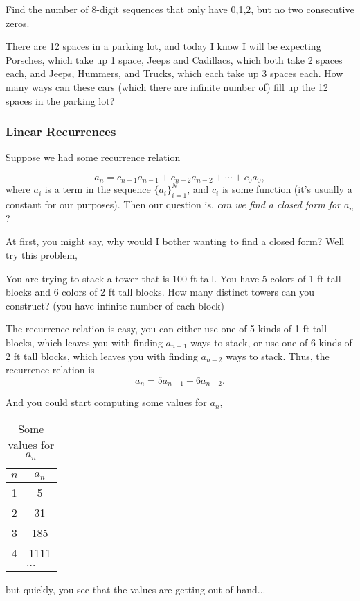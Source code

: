 \begin{ex}
Find the number of 8-digit sequences that only have 0,1,2, but no two consecutive zeros.
\end{ex}

\begin{ex}
There are 12 spaces in a parking lot, and today I know I will be expecting Porsches, which take up 1 space, Jeeps and Cadillacs, which both take 2 spaces each, and Jeeps, Hummers, and Trucks, which each take up 3 spaces each. How many ways can these cars (which there are infinite number of) fill up the 12 spaces in the parking lot?
\end{ex}

\subsubsection{Linear Recurrences}
Suppose we had some recurrence relation 

\begin{equation}
    a_n = c_{n-1}a_{n-1}+c_{n-2}a_{n-2}+\cdots+c_0a_0,
\end{equation}
where $a_i$ is a term in the sequence $\{a_i\}_{i=1}^{N}$, and $c_i$ is some function (it's usually a constant for our purposes). Then our question is, \textit{can we find a closed form for $a_n$}?

At first, you might say, why would I bother wanting to find a closed form? Well try this problem,

\begin{ex}
You are trying to stack a tower that is 100 ft tall. You have 5 colors of 1 ft tall blocks and 6 colors of 2 ft tall blocks. How many distinct towers can you construct? (you have infinite number of each block)
\label{ex:lr}
\end{ex}

The recurrence relation is easy, you can either use one of 5 kinds of 1 ft tall blocks, which leaves you with finding $a_{n-1}$ ways to stack, or use one of 6 kinds of 2 ft tall blocks, which leaves you with finding $a_{n-2}$ ways to stack. Thus, the recurrence relation is
\begin{equation}
    a_n = 5a_{n-1}+6a_{n-2}.
\end{equation}

And you could start computing some values for $a_n$, 

\begin{table}[H]
    \centering
    \begin{tabular}{c|c}
        $n$ & $a_n$\\
        \hline
         1 & 5 \\
         2 & 31 \\
         3 & 185 \\
         4 & 1111 \\
         \multicolumn{2}{c}{
         $\cdots$}
    \end{tabular}
    \caption{Some values for $a_n$}
    \label{tab:my_label}
\end{table}
but quickly, you see that the values are getting out of hand...

